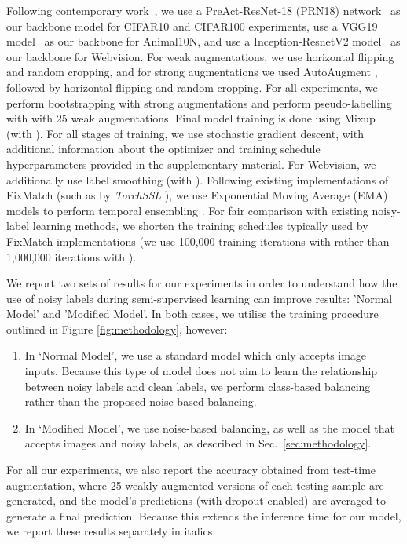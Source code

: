 \documentclass[10pt,twocolumn,letterpaper]{article}
\begin{document}
Following contemporary work~\citep{li2020dividemix, cordeiro2021propmix, liu2020early}, we use a PreAct-ResNet-18 (PRN18) network~\citep{he2016identity} as our backbone model for CIFAR10 and CIFAR100 experiments, use a VGG19 model~\cite{simonyan2014very} as our backbone for Animal10N, and use a Inception-ResnetV2 model~\cite{szegedy2017inception} as our backbone for Webvision. For weak augmentations, we use horizontal flipping and random cropping, and for strong augmentations we used AutoAugment \cite{cubuk2019autoaugment}, followed by horizontal flipping and random cropping. For all experiments, we perform bootstrapping with strong augmentations 
and perform pseudo-labelling with with 25 weak augmentations. Final model training is done using Mixup \cite{zhang2018mixup} (with ). For all stages of training, we use stochastic gradient descent, with additional information about the optimizer and training schedule hyperparameters provided in the supplementary material. For Webvision, we additionally use label smoothing (with ).
Following existing implementations of FixMatch (such as by \textit{TorchSSL} \cite{zhang2021flexmatch}), we use Exponential Moving Average (EMA) models to perform temporal ensembling \cite{Laine2017TemporalEF}. For fair comparison with existing noisy-label learning methods, we shorten the training schedules typically used by FixMatch implementations (we use 100,000 training iterations with  rather than 1,000,000 iterations with ). 

We report two sets of results for our experiments in order to understand how the use of noisy labels during semi-supervised learning can improve results: 'Normal Model' and 'Modified Model'. In both cases, we utilise the training procedure outlined in Figure \ref{fig:methodology}, however:
\begin{enumerate}[label=\arabic*)]
    \item In `Normal Model', we use a standard model which only accepts image inputs. Because this type of model does not aim to learn the relationship between noisy labels and clean labels, we perform class-based balancing rather than the proposed noise-based balancing.
    \item In `Modified Model', we use 
    noise-based balancing, as well as the  model that accepts images and noisy labels, as described in Sec.~\ref{sec:methodology}.
\end{enumerate}
For all our experiments, we also report the accuracy obtained from test-time augmentation, where 25 weakly augmented versions of each testing sample are generated, and the model's predictions (with dropout enabled) are averaged to generate a final prediction. Because this extends the inference time for our model, we report these results separately in italics.
\end{document}
